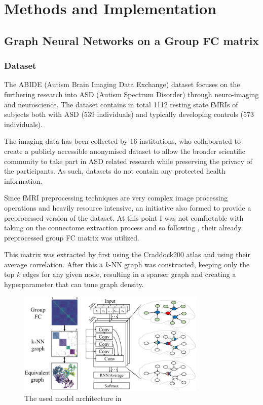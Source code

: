\chapter{Methods and Implementation}

\section{Graph Neural Networks on a Group FC matrix}

	\subsection{Dataset}
	\label{sec:ABIDE}
	
	The ABIDE (Autism Brain Imaging Data Exchange) dataset\cite{di2014autism} focuses on the furthering research into ASD (Autism Spectrum Disorder) through neuro-imaging and neuroscience. The dataset contains in total 1112 resting state fMRIs of subjects both with ASD (539 individuals) and typically developing controls (573 individuals). 
	
	The imaging data has been collected by 16 institutions, who collaborated to create a publicly accessible anonymised dataset to allow the broader scientific community to take part in ASD related research while preserving the privacy of the participants. As such, datasets do not contain any protected health information. 
	
	Since fMRI preprocessing techniques are very complex image processing operations and heavily resource intensive, an initiative also formed to provide a preprocessed version of the dataset. At this point I was not comfortable with taking on the connectome extraction process and so following \cite{wang2021graph}, their already preprocessed group FC matrix was utilized. 
	
	This matrix was extracted by first using the Craddock200 atlas and using their average correlation. After this a $k$-NN graph was constructed, keeping only the top $k$ edges for any given node, resulting in a sparser graph and creating a hyperparameter that can tune graph density.
	
	\begin{figure}[!h]
		\centering
		\includegraphics[width=0.8\textwidth]{figures/cgcn.png}
		\caption{The used model architecture in \cite{wang2021graph}}
	\end{figure}
	
